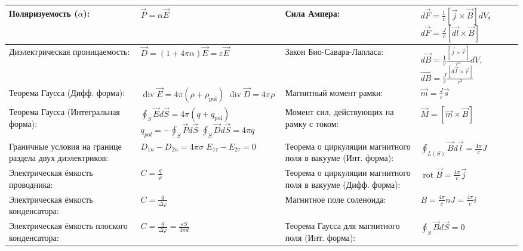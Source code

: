 \documentclass{article}
\begin{document}
\begin{tabular}{ |p{6cm}|p{3.5cm}|p{6cm}|p{3.5cm}|  }
\hline
Поляризуемость ($\alpha$):                                                 &
$\vec{P} = \alpha \vec{E}$                                                 &
Сила Ампера:                                                               & 
$d \vec{F}=\frac{1}{c} [\vec{j} \times \vec{B}] d V$,
$d \vec{F}=\frac{J}{c} [\vec{d{l}} \times \vec{B}]$                        \\
\hline
Диэлектрическая проницаемость:                                             &
$\vec{D}=(1+4 \pi \alpha) \vec{E}=\varepsilon \vec{E}$                     &
Закон Био-Савара-Лапласа:                                                  &  
$d \vec{B}=\frac{1}{c} \frac{[\vec{j} \times \vec{r}]}{r^{3}} d V$,
$\vec{d{B}}=\frac{J}{c} \frac{[d \vec{l} \times \vec{r}]}{r^{3}}$          \\
\hline
Теорема Гаусса (Дифф. форма):                                              & 
$\operatorname{div}{\vec{E}} = 4 \pi \left( \rho+\rho_{\mathrm{pol}} \right)$
$\operatorname{div}{\vec{D}} = 4 \pi \rho$                                 &
Магнитный момент рамки:                                                    &
$\vec{m}=\frac{J}{c} \vec{s}$                                              \\
\hline
Теорема Гаусса (Интегральная форма):                                       &
$\oint_{S} \vec{E} d \vec{S}=4 \pi \left(q+q_{\mathrm{pol}}\right)$ $q_{pol}=-\oint_{S} \vec{P} d \vec{S}$ $\oint_{S} \vec{D} d \vec{S}=4 \pi q$ &
Момент сил, действующих на рамку с током:                                  &
$\vec{M}= [\vec{m} \times \vec{B}]$                                        \\
\hline
Граничные условия на границе раздела двух диэлектриков:                    &
$D_{1 n}-D_{2 n}=4 \pi \sigma$ $E_{1 \tau}-E_{2 \tau}=0$                   &
Теорема о циркуляции магнитного поля в вакууме (Инт. форма):               & 
$\oint_{L(S)} \vec{B} d \vec{l}=\frac{4 \pi}{c} J$                         \\
\hline
Электрическая ёмкость проводника:                                          &
$C= \frac{q}{\varphi}$                                                     &
Теорема о циркуляции магнитного поля в вакууме (Дифф. форма):              & 
$\operatorname{rot} \vec{B}=\frac{4 \pi}{c} \vec{j}$                       \\
\hline
Электрическая ёмкость конденсатора:                                        &
$C=\frac {q}{\Delta \varphi}$                                              &
Магнитное поле соленоида:                                                  &
$B = \frac{4 \pi}{c} n J=\frac{4 \pi}{c} i$                                \\
\hline
Электрическая ёмкость плоского конденсатора:                               &
$C=\frac{q}{\Delta \varphi}=\frac{\varepsilon S}{4 \pi d}$                 &
Теорема Гаусса для магнитного поля (Инт. форма):                           &
$\oint_{S} \vec{B} d \vec{S}=0$                                            \\
\hline
\end{tabular}
\end{document}
